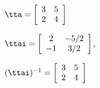 {$\tta = \left[
\begin{array}{cc}
  3 & 5\\
  2 & 4
\end{array}\right]$
}
{$\ttai = \left[
\begin{array}{cc}
2 & -5/2\\
-1 & 3/2
\end{array}
\right]$,

$(\ttai)^{-1} = \left[
\begin{array}{cc}
3 & 5\\
  2 & 4
  \end{array}\right]$
}
